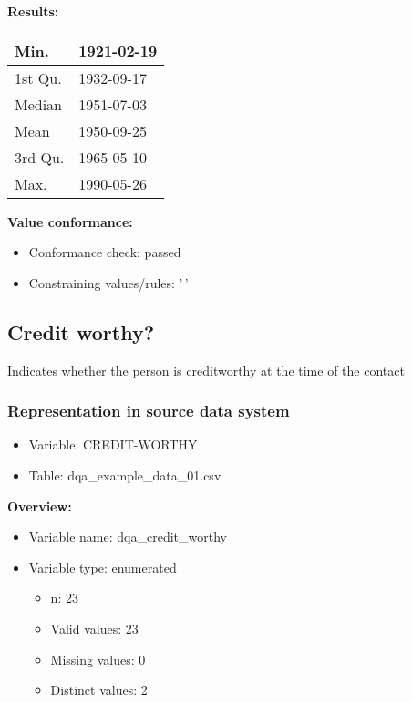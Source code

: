 \documentclass[
]{article}
\providecommand{\tightlist}{%
  \setlength{\itemsep}{0pt}\setlength{\parskip}{0pt}}
\begin{document}
\textbf{Results:}\\

\begin{table}[H]
\centering
\begin{tabular}{l|l}
\hline
Min. & 1921-02-19\\
\hline
1st Qu. & 1932-09-17\\
\hline
Median & 1951-07-03\\
\hline
Mean & 1950-09-25\\
\hline
3rd Qu. & 1965-05-10\\
\hline
Max. & 1990-05-26\\
\hline
\end{tabular}
\end{table}

\textbf{Value conformance:}

\begin{itemize}
\tightlist
\item
  Conformance check: passed
\item
  Constraining values/rules: '\,'
\end{itemize}

\newpage

\hypertarget{credit-worthy}{%
\subsection{Credit worthy?}\label{credit-worthy}}

Indicates whether the person is creditworthy at the time of the contact

\hypertarget{representation-in-source-data-system-3}{%
\subsubsection{\texorpdfstring{Representation in \textbf{source} data
system}{Representation in source data system}}\label{representation-in-source-data-system-3}}

\begin{itemize}
\tightlist
\item
  Variable: CREDIT-WORTHY
\item
  Table: dqa\_example\_data\_01.csv
\end{itemize}

\textbf{Overview:}

\begin{itemize}
\tightlist
\item
  Variable name: dqa\_credit\_worthy
\item
  Variable type: enumerated

  \begin{itemize}
  \tightlist
  \item
    n: 23
  \item
    Valid values: 23
  \item
    Missing values: 0
  \item
    Distinct values: 2
  \end{itemize}
\end{itemize}
\end{document}
